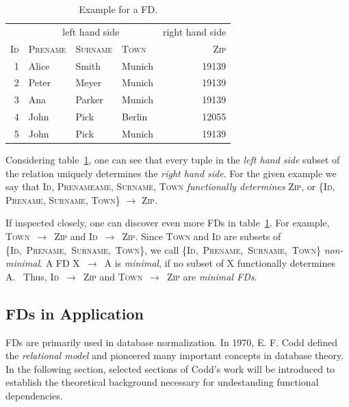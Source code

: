 \begin{table}[ht]
    \centering
    \begin{tabular}{rlllr}
        \toprule
        & \multicolumn{3}{c}{left hand side} & \multicolumn{1}{c}{right hand side} \\ \cmidrule(lr{.25em}){1-4} \cmidrule(l{4.75em}){4-5}
        \textsc{Id} & \textsc{Prename} & \textsc{Surname} & \textsc{Town} & \textsc{Zip} \\
        \midrule
        1 & Alice & Smith & Munich & 19139 \\
        2 & Peter& Meyer & Munich & 19139 \\
        3 & Ana & Parker & Munich & 19139  \\
        4 & John & Pick & Berlin & 12055 \\
        5 & John & Pick & Munich & 19139 \\
        \bottomrule
    \end{tabular}
    \caption{Example for a FD.}\label{tab:fd-example}
\end{table}

Considering table~\ref{tab:fd-example}, one can see that every tuple in the \emph{left hand side} subset of the relation uniquely determines the \emph{right hand side}.
For the given example we say that \textsc{Id}, \textsc{Prenameame}, \textsc{Surname}, \textsc{Town} \emph{functionally determines} \textsc{Zip}, or \{\textsc{Id}, \textsc{Prename}, \textsc{Surname}, \textsc{Town}\} \( \rightarrow \) \textsc{Zip}.~\cite[p.~43]{MAI83}

If inspected closely, one can discover even more FDs in table~\ref{tab:fd-example}.
For example, \textsc{Town}~\( \rightarrow \)~\textsc{Zip} and \textsc{Id}~\( \rightarrow \)~\textsc{Zip}.
Since \textsc{Town} and \textsc{Id} are subsets of \{\textsc{Id},~\textsc{Prename},~\textsc{Surname},~\textsc{Town}\}, we call \{\textsc{Id},~\textsc{Prename},~\textsc{Surname},~\textsc{Town}\} \emph{non-minimal}.
A FD X~\( \rightarrow \)~A is \emph{minimal}, if no subset of X functionally determines A.~\cite[p.~2]{PAP15}
Thus, \textsc{Id}~\( \rightarrow \)~\textsc{Zip} and \textsc{Town}~\( \rightarrow \)~\textsc{Zip} are \emph{minimal FDs}.

\subsection{FDs in Application}
FDs are primarily used in database normalization.\cite[p.~1]{CAR16}
In 1970, E. F. Codd defined the \emph{relational model}\cite{COD70} and pioneered many important concepts in database theory.
In the following section, selected sections of Codd's work will be introduced to establish the theoretical background necessary for undestanding functional dependencies.

